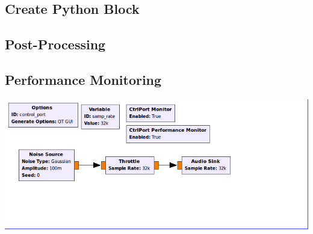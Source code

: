 \documentclass[10pt]{article}
\begin{document}
\begin{multicols*}{3}


\subsection{Create Python Block}



%
%
%

\subsection{Post-Processing}



\subsection{Performance Monitoring}





\includegraphics[width=0.99\linewidth]{control-port.png}


\end{multicols*}
\end{document}
